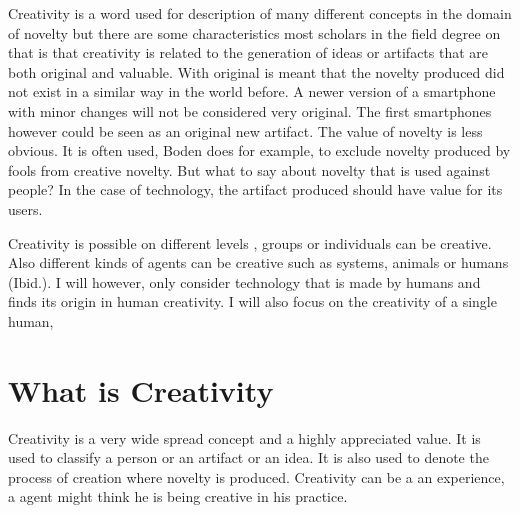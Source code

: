 Creativity is a word used for description of many different concepts in the domain of novelty but there are some characteristics most scholars in the field degree on that is that creativity is related to the generation of ideas or artifacts that are both original and valuable. With original is meant that the novelty produced did not exist in a similar way in the world before. A newer version of a smartphone with minor changes will not be considered very original. The first smartphones however could be seen as an original new artifact. 
The value of novelty is less obvious. It is often used, Boden does for example, to exclude novelty produced by fools from creative novelty. But what to say about novelty that is used against people? In the case of technology, the artifact produced should have value for its users.


Creativity is possible on different levels \cite{Ferguson2010}, groups or individuals can be creative. Also different kinds of agents can be creative such as systems, animals or humans (Ibid.). I will however, only consider technology that is made by humans and finds its origin  in human creativity. I will also focus on the creativity of a single human,

\section{What is Creativity}


Creativity is a very wide spread concept and a highly appreciated value. It is used to classify a person or an artifact or an idea.  It is also used to denote the process of creation where novelty is produced. Creativity can be a an experience, a agent might think he is being creative in his practice.

